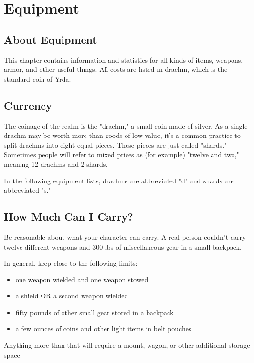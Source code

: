 \chapter{Equipment}

\section{About Equipment}

This chapter contains information and statistics for all kinds
of items, weapons, armor, and other useful things. All costs
are listed in drachm, which is the standard coin of Yrda.

\section{Currency}

The coinage of the realm is the "drachm," a small coin made of silver.
As a single drachm may be worth more than goods of low value, it's a
common practice to split drachms into eight equal pieces. These pieces
are just called "shards." Sometimes people will refer to mixed prices as
(for example) "twelve and two," meaning 12 drachms and 2 shards.

In the following equipment lists, drachms are abbreviated "d" and shards are
abbreviated "s."

\section{How Much Can I Carry?}

Be reasonable about what your character can carry. A real person
couldn't carry twelve different weapons and 300 lbs of miscellaneous
gear in a small backpack.

In general, keep close to the following limits:

\begin{itemize}
  \item one weapon wielded and one weapon stowed
  \item a shield OR a second weapon wielded
  \item fifty pounds of other small gear stored in a backpack
  \item a few ounces of coins and other light items in belt pouches
\end{itemize}

Anything more than that will require a mount, wagon, or other
additional storage space.

